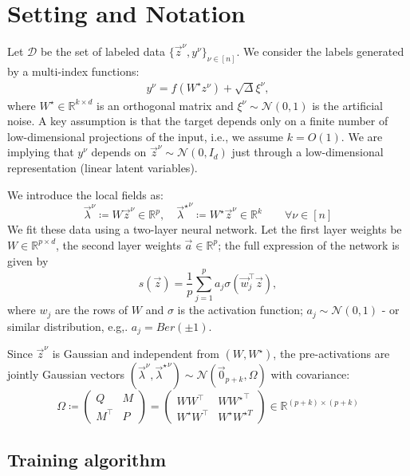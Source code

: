 \documentclass{article}
\theoremstyle{plain}
\theoremstyle{definition}
\theoremstyle{remark}
\begin{document}
\section{Setting and Notation}
Let $\mathcal{D}$ be the set of labeled data $\{\vec{z}^{\nu}, y^{\nu}\}_{\nu \in [n]}$. We consider the labels generated by a multi-index functions:
\begin{align}
    y^\nu = f(W^\star z^\nu) + \sqrt{\Delta} \xi^\nu, 
\end{align}
where \(W^\star \in \mathbb R^{k\times d} \) is an orthogonal matrix and \(\xi^\nu\sim \mathcal{N}{(0,1)}\) is the artificial noise. A key assumption is that the target depends only on a finite number of low-dimensional projections of the input, i.e., we assume \(k =O(1)\). We are implying that \(y^{\nu}\) depends on \(\vec z^\nu \sim \mathcal{N}(0,I_d)\) just through a low-dimensional representation (linear latent variables). 

We introduce the local fields as:
\begin{equation}
    \vec{\lambda}^{\nu}\coloneqq W\vec{z}^{\nu}\in\mathbb{R}^{p}, \quad {\vec{\lambda}^{\star}}^{\nu}\coloneqq W^{\star}\vec{z}^{\nu}\in\mathbb{R}^{k} \qquad \forall \nu \in [n]
\end{equation}
We fit these data using a two-layer neural network. Let the first layer weights be $W \in \mathbb{R}^{p \times d}$, the second layer weights \(\vec a\in\mathbb{R}^p\); the full expression of the network is given by
\[
    s(\vec z) = \frac{1}{p} \sum_{j=1}^p a_j \sigma{(\vec w_j^\top \vec z)},
\]
where \(w_j\) are the rows of \(W\) and \(\sigma\) is the activation function; \(a_j \sim \mathcal{N}(0,1)\) - or similar distribution, e.g,. $a_j = Ber(\pm 1)$. 

Since $\vec{z}^\nu$ is Gaussian and independent from $(W, W^{\star})$, the pre-activations are jointly Gaussian vectors $(\vec{\lambda}^{\nu}, {\vec{\lambda}^{\star}}^{\nu})\sim\mathcal{N}(\vec{0}_{p+k}, \Omega)$ with covariance: 
\begin{equation}
\Omega \coloneqq
\begin{pmatrix}
Q & M\\
{M^{\top}} & P
\end{pmatrix}=
\begin{pmatrix}
W{W}^{\top} & W{W^{\star}}^{\top}\\
W^{\star}W^{\top} & W^{\star} W^{\star T}
\end{pmatrix}
\in\mathbb{R}^{(p+k)\times (p+k)}
\end{equation}
\subsection*{Training algorithm}
\end{document}
